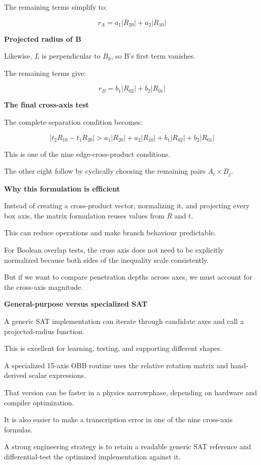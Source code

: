 The remaining terms simplify to:

\[
\boxed{ r_A=a_1|R_{20}|+a_2|R_{10}| }
\]

\textbf{Projected radius of B}

Likewise, \(L\) is perpendicular to \(B_0\), so B's first term vanishes.

The remaining terms give:

\[
\boxed{ r_B=b_1|R_{02}|+b_2|R_{01}| }
\]

\textbf{The final cross-axis test}

The complete separation condition becomes:

\[
\boxed{ |t_2R_{10}-t_1R_{20}| > a_1|R_{20}|+ a_2|R_{10}|+ b_1|R_{02}|+ b_2|R_{01}| }
\]

This is one of the nine edge-cross-product conditions.

The other eight follow by cyclically choosing the remaining pairs \(A_i\times B_j\).

\textbf{Why this formulation is efficient}

Instead of creating a cross-product vector, normalizing it, and projecting every box axis, the matrix formulation reuses values from \(R\) and \(t\).

This can reduce operations and make branch behaviour predictable.

For Boolean overlap tests, the cross axis does not need to be explicitly normalized because both sides of the inequality scale consistently.

But if we want to compare penetration depths across axes, we must account for the cross-axis magnitude.

\textbf{General-purpose versus specialized SAT}

A generic SAT implementation can iterate through candidate axes and call a projected-radius function.

This is excellent for learning, testing, and supporting different shapes.

A specialized 15-axis OBB routine uses the relative rotation matrix and hand-derived scalar expressions.

That version can be faster in a physics narrowphase, depending on hardware and compiler optimization.

It is also easier to make a transcription error in one of the nine cross-axis formulas.

A strong engineering strategy is to retain a readable generic SAT reference and differential-test the optimized implementation against it.

